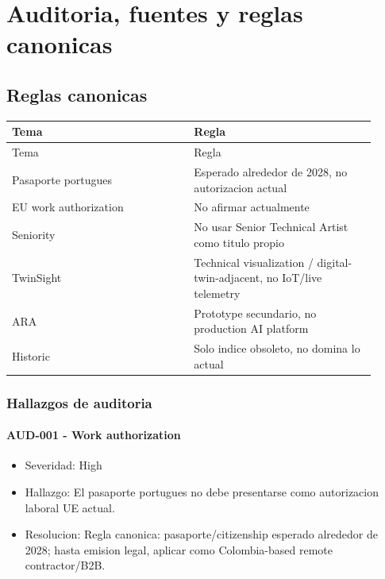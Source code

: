 \chapter{Auditoria, fuentes y reglas canonicas}

\section{Reglas canonicas}


\begin{center}
\scriptsize
\begin{longtable}{>{\raggedright\arraybackslash}p{0.455\linewidth} >{\raggedright\arraybackslash}p{0.455\linewidth}}
\toprule
Tema & Regla \\
\midrule
\endfirsthead
\toprule
Tema & Regla \\
\midrule
\endhead
Pasaporte portugues & Esperado alrededor de 2028, no autorizacion actual \\
EU work authorization & No afirmar actualmente \\
Seniority & No usar Senior Technical Artist como titulo propio \\
TwinSight & Technical visualization / digital-twin-adjacent, no IoT/live telemetry \\
ARA & Prototype secundario, no production AI platform \\
Historic & Solo indice obsoleto, no domina lo actual \\
\bottomrule
\end{longtable}
\end{center}



\subsection{Hallazgos de auditoria}


\subsubsection{AUD-001 - Work authorization}


\begin{itemize}
\item Severidad: High
\item Hallazgo: El pasaporte portugues no debe presentarse como autorizacion laboral UE actual.
\item Resolucion: Regla canonica: pasaporte/citizenship esperado alrededor de 2028; hasta emision legal, aplicar como Colombia-based remote contractor/B2B.
\end{itemize}


